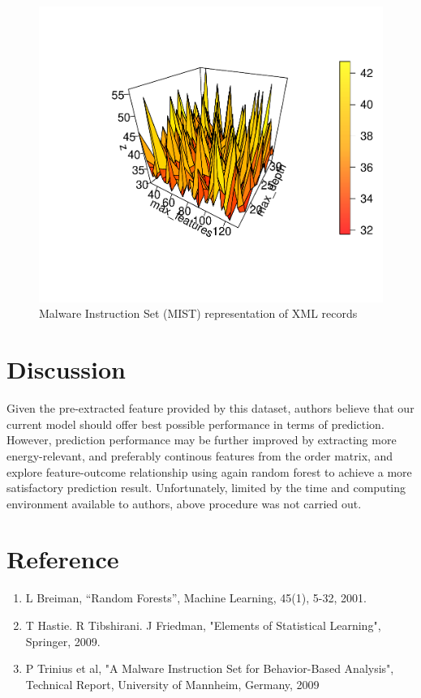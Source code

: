 \documentclass[11pt]{article}
\theoremstyle{definition}
\begin{document}
\begin{figure}[!h]
    \centering
    \includegraphics[width=\textwidth]{"./plots/select"}
    \caption{Malware Instruction Set (MIST) representation of XML records}
    \label{fig:par_select}
\end{figure}

\newpage
\section{\textbf{Discussion}}

Given the pre-extracted feature provided by this dataset, authors believe that  our current model should offer best possible performance in terms of prediction. However, prediction performance may be further improved by extracting more energy-relevant, and preferably continous features from the order matrix, and explore feature-outcome relationship  using again random forest to achieve a more satisfactory prediction result. Unfortunately, limited by the time and computing environment available to authors, above procedure was not carried out.


\vspace{2em}
\section*{\textbf{Reference}}
\begin{enumerate}
\item L Breiman, “Random Forests”, Machine Learning, 45(1), 5-32, 2001. 
\item T Hastie. R Tibshirani. J Friedman, "Elements of Statistical Learning", Springer, 2009.
\item P Trinius et al, "A Malware Instruction Set for Behavior-Based Analysis", Technical Report, University of Mannheim, Germany, 2009
\end{enumerate}
\end{document}
